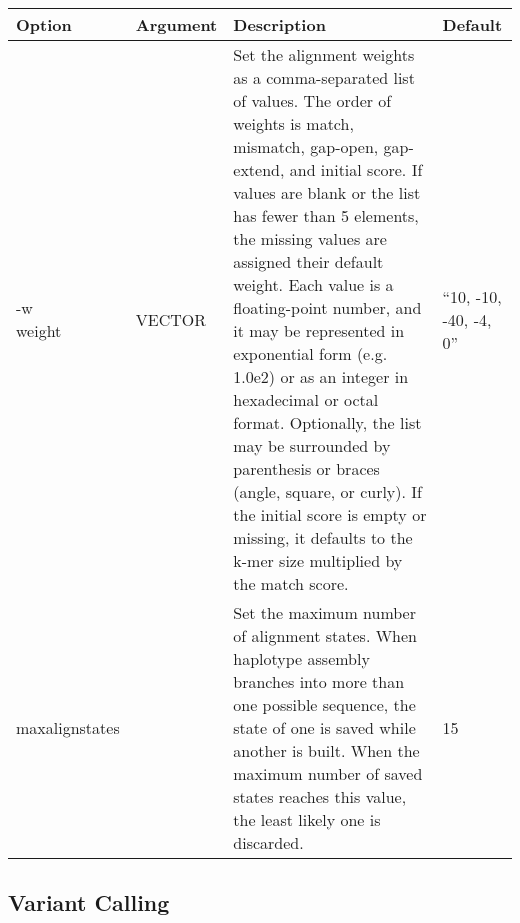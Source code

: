 \begin{small}
	\begin{longtable}{|p{\optwidth}|p{\argwidth}|p{\dscwidth}|p{}|}
		\hline
		
		\textbf{Option} & \textbf{Argument} & \textbf{Description} & \textbf{Default} \\ \hline
		
		\optbox{-w\\\ddash{}weight} & VECTOR &
		Set the alignment weights as a comma-separated list of values. The order of weights is match, mismatch, gap-open, gap-extend, and initial score. If values are blank or the list has fewer than 5 elements, the missing values are assigned their default weight. Each value is a floating-point number, and it may be represented in exponential form (e.g. 1.0e2) or as an integer in hexadecimal or octal format. Optionally, the list may be surrounded by parenthesis or braces (angle, square, or curly). If the initial score is empty or missing, it defaults to the k-mer size multiplied by the match score.
		& ``10, -10, -40, -4, 0''
		\\ \hline
		
		\ddash{}maxalignstates & &
		Set the maximum number of alignment states. When haplotype assembly branches into more than one possible sequence, the state of one is saved while another is built. When the maximum number of saved states reaches this value, the least likely one is discarded.
		& 15
		\\ \hline

	\end{longtable}
\end{small}



\subsection{Variant Calling}
\label{sec.cmdline.opts.haplo}

